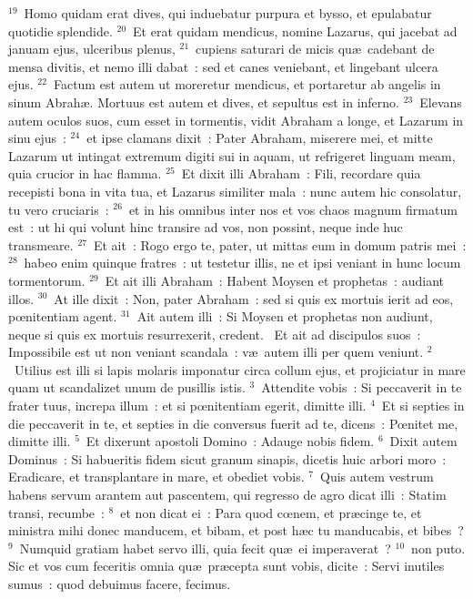 ${}^{19}$~Homo quidam erat dives, qui induebatur purpura et bysso, et epulabatur quotidie splendide.
${}^{20}$~Et erat quidam mendicus, nomine Lazarus, qui jacebat ad januam ejus, ulceribus plenus,
${}^{21}$~cupiens saturari de micis qu\ae\ cadebant de mensa divitis, et nemo illi dabat~: sed et canes veniebant, et lingebant ulcera ejus.
${}^{22}$~Factum est autem ut moreretur mendicus, et portaretur ab angelis in sinum Abrah\ae . Mortuus est autem et dives, et sepultus est in inferno.
${}^{23}$~Elevans autem oculos suos, cum esset in tormentis, vidit Abraham a longe, et Lazarum in sinu ejus~:
${}^{24}$~et ipse clamans dixit~: Pater Abraham, miserere mei, et mitte Lazarum ut intingat extremum digiti sui in aquam, ut refrigeret linguam meam, quia crucior in hac flamma.
${}^{25}$~Et dixit illi Abraham~: Fili, recordare quia recepisti bona in vita tua, et Lazarus similiter mala~: nunc autem hic consolatur, tu vero cruciaris~:
${}^{26}$~et in his omnibus inter nos et vos chaos magnum firmatum est~: ut hi qui volunt hinc transire ad vos, non possint, neque inde huc transmeare.
${}^{27}$~Et ait~: Rogo ergo te, pater, ut mittas eum in domum patris mei~:
${}^{28}$~habeo enim quinque fratres~: ut testetur illis, ne et ipsi veniant in hunc locum tormentorum.
${}^{29}$~Et ait illi Abraham~: Habent Moysen et prophetas~: audiant illos.
${}^{30}$~At ille dixit~: Non, pater Abraham~: sed si quis ex mortuis ierit ad eos, pœnitentiam agent.
${}^{31}$~Ait autem illi~: Si Moysen et prophetas non audiunt, neque si quis ex mortuis resurrexerit, credent.
~Et ait ad discipulos suos~: Impossibile est ut non veniant scandala~: v\ae\ autem illi per quem veniunt.
${}^{2}$~Utilius est illi si lapis molaris imponatur circa collum ejus, et projiciatur in mare quam ut scandalizet unum de pusillis istis.
${}^{3}$~Attendite vobis~: Si peccaverit in te frater tuus, increpa illum~: et si pœnitentiam egerit, dimitte illi.
${}^{4}$~Et si septies in die peccaverit in te, et septies in die conversus fuerit ad te, dicens~: Pœnitet me, dimitte illi.
${}^{5}$~Et dixerunt apostoli Domino~: Adauge nobis fidem.
${}^{6}$~Dixit autem Dominus~: Si habueritis fidem sicut granum sinapis, dicetis huic arbori moro~: Eradicare, et transplantare in mare, et obediet vobis.
${}^{7}$~Quis autem vestrum habens servum arantem aut pascentem, qui regresso de agro dicat illi~: Statim transi, recumbe~:
${}^{8}$~et non dicat ei~: Para quod cœnem, et pr\ae cinge te, et ministra mihi donec manducem, et bibam, et post h\ae c tu manducabis, et bibes~?
${}^{9}$~Numquid gratiam habet servo illi, quia fecit qu\ae\ ei imperaverat~?
${}^{10}$~non puto. Sic et vos cum feceritis omnia qu\ae\ pr\ae cepta sunt vobis, dicite~: Servi inutiles sumus~: quod debuimus facere, fecimus.


